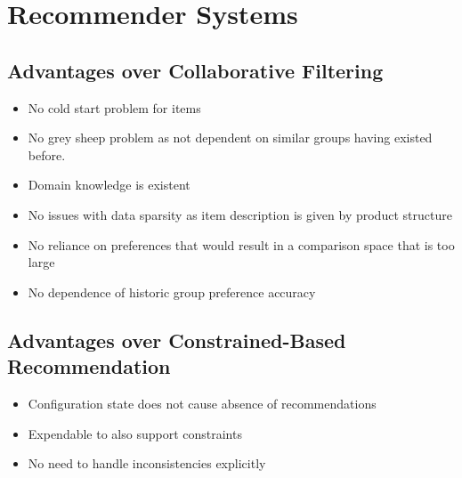 \section{Recommender Systems}

\subsection{Advantages over Collaborative Filtering}
\begin{itemize}
    \item No cold start problem for items
    \item No grey sheep problem as not dependent on similar groups having existed before.
    \item Domain knowledge is existent
    \item No issues with data sparsity as item description is given by product structure
    \item No reliance on preferences that would result in a comparison space that is too large
    \item No dependence of historic group preference accuracy 
\end{itemize}

\subsection{Advantages over Constrained-Based Recommendation}

\begin{itemize}
    \item Configuration state does not cause absence of recommendations
    \item Expendable to also support constraints 
    \item No need to handle inconsistencies explicitly
\end{itemize}

